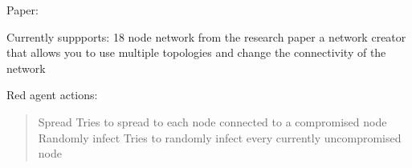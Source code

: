 \documentclass[letterpaper,10pt,english]{sphinxmanual}
\begin{document}
\sphinxAtStartPar
Paper: 

\sphinxAtStartPar
Currently suppports:
\sphinxhyphen{} 18 node network from the research paper
\sphinxhyphen{} a network creator that allows you to use multiple topologies and change the connectivity of the network

\sphinxAtStartPar
Red agent actions:
\begin{quote}

\sphinxAtStartPar
Spread \sphinxhyphen{} Tries to spread to each node connected to a compromised node
Randomly infect \sphinxhyphen{} Tries to randomly infect every currently un\sphinxhyphen{}compromised node
\end{quote}
\end{document}
